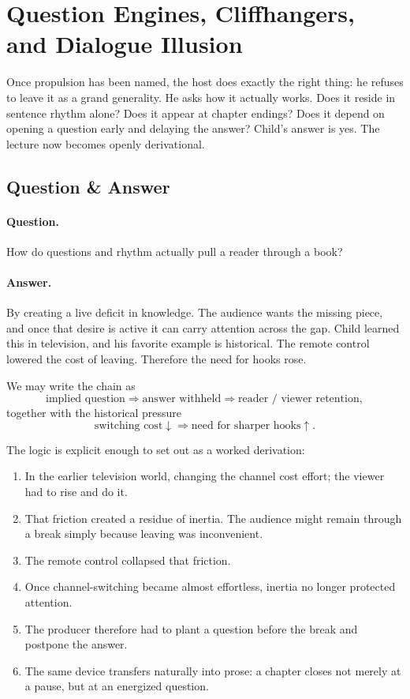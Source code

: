 \section{Question Engines, Cliffhangers, and Dialogue Illusion}

Once propulsion has been named, the host does exactly the right thing: he refuses to leave it as a grand generality. He asks how it actually works. Does it reside in sentence rhythm alone? Does it appear at chapter endings? Does it depend on opening a question early and delaying the answer? Child's answer is yes. The lecture now becomes openly derivational.

\subsection{Question \& Answer}

\paragraph{Question.} How do questions and rhythm actually pull a reader through a book?

\paragraph{Answer.} By creating a live deficit in knowledge. The audience wants the missing piece, and once that desire is active it can carry attention across the gap. Child learned this in television, and his favorite example is historical. The remote control lowered the cost of leaving. Therefore the need for hooks rose.

We may write the chain as
\begin{equation}
\text{implied question} \Longrightarrow \text{answer withheld} \Longrightarrow \text{reader / viewer retention},
\end{equation}
together with the historical pressure
\begin{equation}
\text{switching cost} \downarrow \Longrightarrow \text{need for sharper hooks} \uparrow.
\end{equation}

The logic is explicit enough to set out as a worked derivation:
\begin{enumerate}
\item In the earlier television world, changing the channel cost effort; the viewer had to rise and do it.
\item That friction created a residue of inertia. The audience might remain through a break simply because leaving was inconvenient.
\item The remote control collapsed that friction.
\item Once channel-switching became almost effortless, inertia no longer protected attention.
\item The producer therefore had to plant a question before the break and postpone the answer.
\item The same device transfers naturally into prose: a chapter closes not merely at a pause, but at an energized question.
\end{enumerate}

